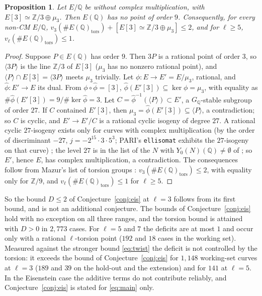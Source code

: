 \documentclass[11pt]{amsart}
\newtheorem{proposition}[theorem]{Proposition}
\theoremstyle{definition}
\newcommand{\Q}{\mathbb{Q}}
\newcommand{\Z}{\mathbb{Z}}
\begin{document}
\begin{proposition}\label{prop:no9}
Let $E/\Q$ be without complex multiplication, with $E[3]\simeq\Z/3\oplus\mu_3$. Then $E(\Q)$ has no point of order $9$. Consequently, for every non-CM $E/\Q$, $v_3(\#E(\Q)_{\mathrm{tors}})+[E[3]\simeq\Z/3\oplus\mu_3]\le2$, and for $\ell\ge5$, $v_\ell(\#E(\Q)_{\mathrm{tors}})\le1$.
\end{proposition}
\begin{proof}
Suppose $P\in E(\Q)$ has order $9$. Then $3P$ is a rational point of order $3$, so $\langle3P\rangle$ is the line $\Z/3$ of $E[3]$ ($\mu_3$ has no nonzero rational point), and $\langle P\rangle\cap E[3]=\langle3P\rangle$ meets $\mu_3$ trivially. Let $\phi\colon E\to E'=E/\mu_3$, rational, and $\hat\phi\colon E'\to E$ its dual. From $\phi\circ\hat\phi=[3]$, $\hat\phi(E'[3])\subseteq\ker\phi=\mu_3$, with equality as $\#\hat\phi(E'[3])=9/\#\ker\hat\phi=3$. Let $C=\hat\phi^{-1}(\langle P\rangle)\subset E'$, a $G_\Q$-stable subgroup of order $27$. If $C$ contained $E'[3]$, then $\mu_3=\hat\phi(E'[3])\subseteq\langle P\rangle$, a contradiction; so $C$ is cyclic, and $E'\to E'/C$ is a rational cyclic isogeny of degree $27$. A rational cyclic $27$-isogeny exists only for curves with complex multiplication (by the order of discriminant $-27$, $j=-2^{15}\cdot3\cdot5^3$; PARI's \texttt{ellisomat} exhibits the $27$-isogeny on that curve) \cite{Ligozat75}; the level $27$ is in the list of the $N$ with $Y_0(N)(\Q)\ne\emptyset$ of \cite[Theorem 1]{Kenku}; so $E'$, hence $E$, has complex multiplication, a contradiction. The consequences follow from Mazur's list of torsion groups \cite{Mazur77}: $v_3(\#E(\Q)_{\mathrm{tors}})\le2$, with equality only for $\Z/9$, and $v_\ell(\#E(\Q)_{\mathrm{tors}})\le1$ for $\ell\ge5$.
\end{proof}

So the bound $D\le2$ of Conjecture~\ref{conj:eis} at $\ell=3$ follows from its first bound, and is not an additional conjecture. The bounds of Conjecture~\ref{conj:eis} hold with no exception on all three ranges, and the torsion bound is attained with $D>0$ in $2{,}773$ cases. For $\ell=5$ and $7$ the deficits are at most $1$ and occur only with a rational $\ell$-torsion point ($192$ and $18$ cases in the working set). Measured against the stronger bound \eqref{eq:twist} the deficit is not controlled by the torsion: it exceeds the bound of Conjecture~\ref{conj:eis} for $1{,}148$ working-set curves at $\ell=3$ ($189$ and $39$ on the hold-out and the extension) and for $141$ at $\ell=5$. In the Eisenstein case the additive terms do not contribute reliably, and Conjecture~\ref{conj:eis} is stated for \eqref{eq:main} only.
\end{document}
